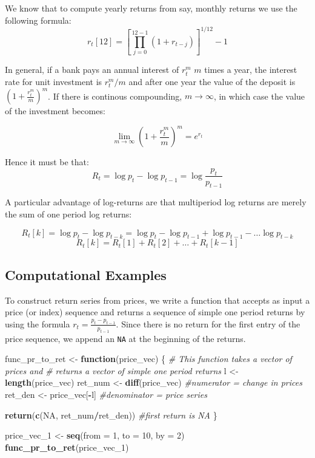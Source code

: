 \documentclass[11pt,]{article}
\newenvironment{Shaded}{\begin{snugshade}}{\end{snugshade}}
\newcommand{\KeywordTok}[1]{\textcolor[rgb]{0.13,0.29,0.53}{\textbf{#1}}}
\newcommand{\DataTypeTok}[1]{\textcolor[rgb]{0.13,0.29,0.53}{#1}}
\newcommand{\DecValTok}[1]{\textcolor[rgb]{0.00,0.00,0.81}{#1}}
\newcommand{\StringTok}[1]{\textcolor[rgb]{0.31,0.60,0.02}{#1}}
\newcommand{\CommentTok}[1]{\textcolor[rgb]{0.56,0.35,0.01}{\textit{#1}}}
\newcommand{\OtherTok}[1]{\textcolor[rgb]{0.56,0.35,0.01}{#1}}
\newcommand{\ControlFlowTok}[1]{\textcolor[rgb]{0.13,0.29,0.53}{\textbf{#1}}}
\newcommand{\OperatorTok}[1]{\textcolor[rgb]{0.81,0.36,0.00}{\textbf{#1}}}
\newcommand{\NormalTok}[1]{#1}
\begin{document}
We know that to compute yearly returns from say, monthly returns we use
the following formula:
\[r_{t}[12]= [\prod_{j=0}^{12-1}(1+r_{t-j})]^{1/12}-1\]

In general, if a bank pays an annual interest of \(r^m_t\) \(m\) times a
year, the interest rate for unit investment is \(r^m_t/m\) and after one
year the value of the deposit is \((1+\frac{r_t^m}{m})^m\). If there is
continous compounding, \(m\to \infty\), in which case the value of the
investment becomes:

\[\lim\limits_{m\to \infty}(1+\frac{r_t^m}{m})^m = e^{r_t}\]

Hence it must be that:
\[R_t = \log p_t-\log p_{t-1} = \log\frac{p_t}{p_{t-1}}\]

A particular advantage of log-returns are that multiperiod log returns
are merely the sum of one period log returns:

\[R_t[k]=\log p_t - \log p_{t-k}=\log p_t - \log p_{t-1} + \log p_{t-1} -\hdots \log p_{t-k}\]
\[R_t[k]= R_t[1]+R_t[2]+\hdots+R_t[k-1]\]

\subsection{Computational Examples}\label{computational-examples}

To construct return series from prices, we write a function that accepts
as input a price (or index) sequence and returns a sequence of simple
one period returns by using the formula
\(r_t = \frac{p_t-p_{t-1}}{p_{t-1}}\). Since there is no return for the
first entry of the price sequence, we append an \texttt{NA} at the
beginning of the returns.

\begin{Shaded}
\begin{Highlighting}[]
\NormalTok{func_pr_to_ret <-}\StringTok{ }\ControlFlowTok{function}\NormalTok{(price_vec)}
\NormalTok{\{}
  \CommentTok{# This function takes a vector of prices and }
  \CommentTok{# returns a vector of simple one period returns}
\NormalTok{  l <-}\StringTok{ }\KeywordTok{length}\NormalTok{(price_vec) }
\NormalTok{  ret_num <-}\StringTok{ }\KeywordTok{diff}\NormalTok{(price_vec) }\CommentTok{#numerator = change in prices}
\NormalTok{  ret_den <-}\StringTok{ }\NormalTok{price_vec[}\OperatorTok{-}\NormalTok{l] }\CommentTok{#denominator = price series}
  
  \KeywordTok{return}\NormalTok{(}\KeywordTok{c}\NormalTok{(}\OtherTok{NA}\NormalTok{, ret_num}\OperatorTok{/}\NormalTok{ret_den)) }\CommentTok{#first return is NA}
\NormalTok{\}}

\NormalTok{price_vec_}\DecValTok{1}\NormalTok{ <-}\StringTok{ }\KeywordTok{seq}\NormalTok{(}\DataTypeTok{from =} \DecValTok{1}\NormalTok{, }\DataTypeTok{to =} \DecValTok{10}\NormalTok{, }\DataTypeTok{by =} \DecValTok{2}\NormalTok{)}
\KeywordTok{func_pr_to_ret}\NormalTok{(price_vec_}\DecValTok{1}\NormalTok{)}
\end{Highlighting}
\end{Shaded}
\end{document}
